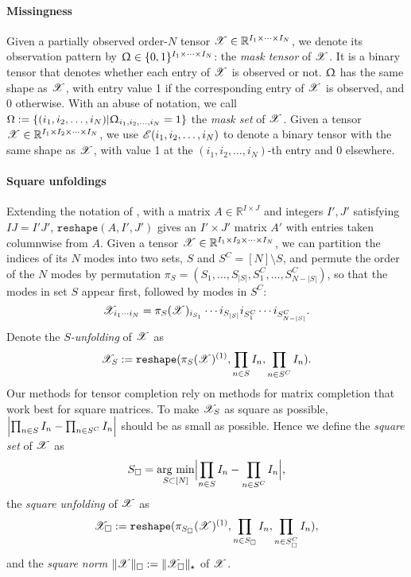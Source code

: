 \documentclass{article}
\newcommand{\T}[2][]{#1\mathscr{\MakeUppercase{#2}}}
\newcommand{\norm}[1]{\Vert #1 \Vert}
\newcommand{\snorm}[1]{\norm{#1}_\square}
\newcommand{\nucnorm}[1]{\norm{#1}_\star}
\theoremstyle{plain}
\begin{document}
\paragraph{Missingness}
Given a partially observed order-$N$ tensor $\T{X} \in \mathbb{R}^{I_1 \times \cdots \times I_N}$, we denote its observation pattern by $\Upomega \in \{0, 1\}^{I_1 \times \cdots \times I_N}$:  the \emph{mask tensor} of $\T{X}$. It is a binary tensor that denotes whether each entry of $\T{X}$ is observed or not.
$\Upomega$ has the same shape as $\T{X}$, with entry value 1 if the corresponding entry of $\T{X}$ is observed, and 0 otherwise.
With an abuse of notation, we call $\Omega := \{(i_1, i_2, \dots, i_N) | \Upomega_{i_1, i_2, \dots, i_N} = 1\}$ the \emph{mask set} of $\T{X}$.
Given a tensor $\T{X} \in \mathbb{R}^{I_1 \times I_2 \times \cdots \times I_N}$, we use $\T{E}(i_1, i_2, \dots, i_N)$ to denote a binary tensor with the same shape as $\T{X}$, with value 1 at the $(i_1, i_2, \dots, i_N)$-th entry and 0 elsewhere.

\paragraph{Square unfoldings}
Extending the notation of \cite{mu2014square}, with a matrix $A \in \mathbb{R}^{I \times J}$ and integers $I', J'$ satisfying $IJ = I' J'$, $\texttt{reshape} (A, I', J')$ gives an $I' \times J'$ matrix $A'$ with entries taken columnwise from $A$.
Given a tensor $\T{X} \in \mathbb{R}^{I_1 \times I_2 \times \cdots \times I_N}$, we can partition the indices of its $N$ modes into two sets, $S$ and $S^C = [N] \setminus S$, 
and permute the order of the $N$ modes by permutation $\pi_S = (S_1, \ldots, S_{|S|}, S^C_1, \ldots, S^C_{N - |S|})$, 
so that the modes in set $S$
appear first, followed by modes in $S^C$:
\[
\T{X}_{i_1 \cdots i_N} = \pi_S(\T{X})_{i_{S_1}} \cdots i_{S_{|S|}} i_{S^C_1} \cdots i_{S^C_{N - |S|}}.
\]
Denote the \emph{$S$-unfolding} of $\T{X}$ as 
\[
\T{X}_S := \texttt{reshape} (\pi_S(\T{X})^{(1)}, \prod_{n \in S} I_n, \prod_{n \in S^C} I_n).
\]
Our methods for tensor completion rely on methods for matrix completion that work best for square matrices. To make $\T{X}_S$ as square as possible, $\Bigl |\prod_{n \in S} I_n -  \prod_{n \in S^C} I_n\Bigr |$ should be as small as possible. Hence we define the \emph{square set} of $\T{X}$ as
\begin{equation}
	S_\square = \underset{S \subset [N]}{\text{arg min}} \Bigl |\prod_{n \in S} I_n -  \prod_{n \in S^C} I_n\Bigr |,
	\nonumber
\end{equation}
the \emph{square unfolding} of $\T{X}$ as
\begin{equation}
	\T{X}_{\square} := \texttt{reshape} (\pi_{S_\square} (\T{X})^{(1)}, \prod_{n \in S_\square} I_n, \prod_{n \in S^C_\square} I_n),
	\nonumber
\end{equation}
and the \emph{square norm} $\snorm{\T{X}} := \nucnorm{\T{X}_\square}$  of $\T{X}$.
\end{document}

